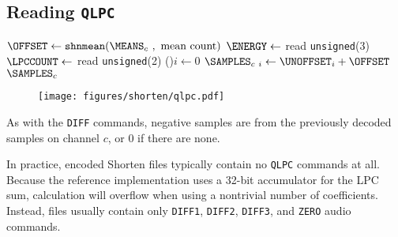 \clearpage

\subsection{Reading \texttt{QLPC}}
\label{shorten:read_qlpc}
{
$\text{\OFFSET} \leftarrow \texttt{shnmean}(\text{\MEANS}_c~,~\text{mean count})$\;
$\ENERGY \leftarrow$ read \texttt{unsigned}(3)\;
$\LPCCOUNT \leftarrow$ read \texttt{unsigned}(2)\;
\For(){$i \leftarrow 0$ \emph{\KwTo}\BLOCKLENGTH}{
  $\text{\SAMPLES}_{c~i} \leftarrow \text{\UNOFFSET}_i + \OFFSET$
}
\Return $\text{\SAMPLES}_c$\;
\EALGORITHM
}
\begin{figure}[h]
\texttt{[image: figures/shorten/qlpc.pdf]}
\end{figure}
\par
\noindent
As with the \texttt{DIFF} commands, negative samples are from the
previously decoded samples on channel $c$, or 0 if there are none.

In practice, encoded Shorten files typically contain no
\texttt{QLPC} commands at all.
Because the reference implementation uses a 32-bit
accumulator for the LPC sum,
calculation will overflow when using a nontrivial number of
coefficients.
Instead, files usually contain only \texttt{DIFF1}, \texttt{DIFF2},
\texttt{DIFF3}, and \texttt{ZERO} audio commands.

\clearpage

